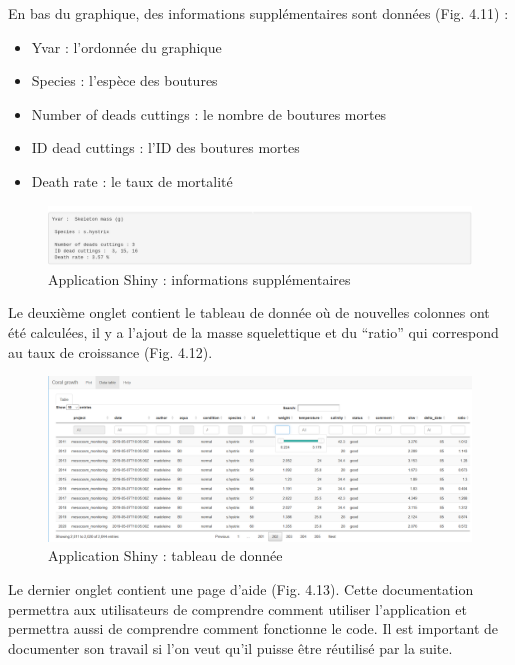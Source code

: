 \documentclass[]{report}
\providecommand{\tightlist}{%
  \setlength{\itemsep}{0pt}\setlength{\parskip}{0pt}}
\begin{document}
En bas du graphique, des informations supplémentaires sont données (Fig.
4.11) :

\begin{itemize}
\tightlist
\item
  Yvar : l'ordonnée du graphique
\item
  Species : l'espèce des boutures
\item
  Number of deads cuttings : le nombre de boutures mortes
\item
  ID dead cuttings : l'ID des boutures mortes
\item
  Death rate : le taux de mortalité
\end{itemize}

\begin{figure}[h!]
\includegraphics[]{../image/verbatim.PNG}
\caption{Application Shiny : informations supplémentaires}
\end{figure}

Le deuxième onglet contient le tableau de donnée où de nouvelles
colonnes ont été calculées, il y a l'ajout de la masse squelettique et
du ``ratio'' qui correspond au taux de croissance (Fig. 4.12).

\begin{figure}[h!]
\includegraphics[]{../image/notebook-table1.png}
\caption{Application Shiny : tableau de donnée}
\end{figure}

Le dernier onglet contient une page d'aide (Fig. 4.13). Cette
documentation permettra aux utilisateurs de comprendre comment utiliser
l'application et permettra aussi de comprendre comment fonctionne le
code. Il est important de documenter son travail si l'on veut qu'il
puisse être réutilisé par la suite.
\end{document}
